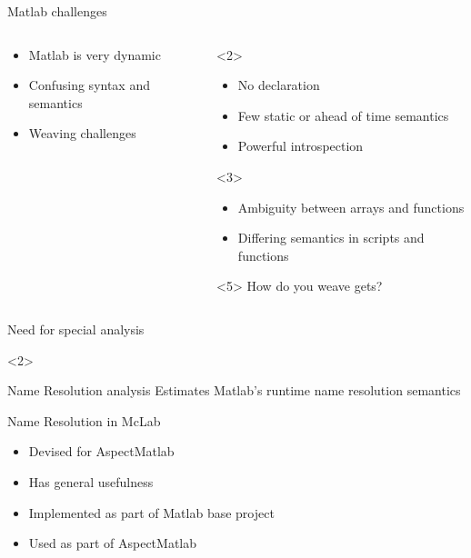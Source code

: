 \begin{frame}{Matlab challenges}
  \begin{columns}
    \begin{column}{5cm}
      \begin{itemize}
      \item<alert@2> Matlab is very dynamic
      \item<alert@3> Confusing syntax and semantics
      \item<alert@4-> Weaving challenges
      \end{itemize}
    \end{column}
    \begin{column}{5cm}
      \begin{onlyenv}<2>
          \begin{itemize}
          \item No declaration 
          \item Few static or ahead of time semantics
          \item Powerful introspection
          \end{itemize}
      \end{onlyenv}
      \begin{onlyenv}<3>
          \begin{itemize}
          \item Ambiguity between arrays and functions
          \item Differing semantics in scripts and functions 
          \end{itemize}
      \end{onlyenv}
      \begin{onlyenv}<5>
          How do you weave gets?
      \end{onlyenv}
    \end{column}
  \end{columns}
\end{frame}

\begin{frame}{Need for special analysis}
  \begin{onlyenv}<2>
    \begin{block}{Name Resolution analysis}
      Estimates Matlab's runtime name resolution semantics
    \end{block}
  \end{onlyenv}
\end{frame}
\begin{frame}{Name Resolution in McLab}
  \begin{itemize}
  \item Devised for AspectMatlab
  \item Has general usefulness
  \item Implemented as part of Matlab base project
  \item Used as part of AspectMatlab
  \end{itemize}
\end{frame}